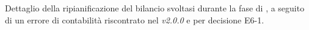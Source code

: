 Dettaglio della ripianificazione del bilancio
svoltasi durante la fase di \fC, a seguito di un errore di contabilità riscontrato nel \PP \emph{v2.0.0} e per decisione E6-1.
